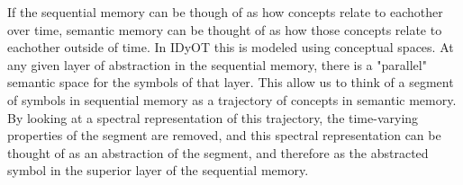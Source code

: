 If the sequential memory can be though of as how concepts relate to eachother over time, semantic memory can be thought of as how those concepts relate to eachother outside of time.  In IDyOT this is modeled using conceptual spaces.  At any given layer of abstraction in the sequential memory, there is a "parallel" semantic space for the symbols of that layer.  This allow us to think of a segment of symbols in sequential memory as a trajectory of concepts in semantic memory.  By looking at a spectral representation of this trajectory, the time-varying properties of the segment are removed, and this spectral representation can be thought of as an abstraction of the segment, and therefore as the abstracted symbol in the superior layer of the sequential memory.
